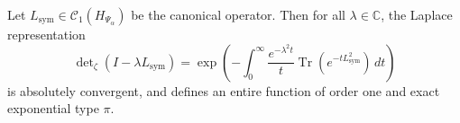 \begin{lemma}\label{lem:laplace_heat_trace_convergence}
Let \( L_{\mathrm{sym}} \in \mathcal{C}_1(H_{\Psi_\alpha}) \) be the canonical operator. Then for all \( \lambda \in \mathbb{C} \), the Laplace representation
\begin{equation}
\det\nolimits_\zeta(I - \lambda L_{\mathrm{sym}}) = \exp\left(- \int_0^\infty \frac{e^{-\lambda^2 t}}{t} \operatorname{Tr}(e^{-t L_{\mathrm{sym}}^2}) \, dt \right)
\end{equation}
is absolutely convergent, and defines an entire function of order one and exact exponential type \( \pi \).
\end{lemma}
%  